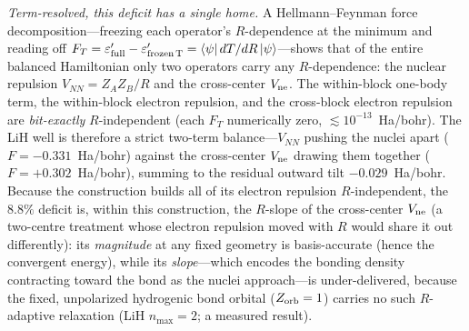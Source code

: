 \documentclass[aps,pra,twocolumn,superscriptaddress,longbibliography]{revtex4-2}
\begin{document}
\emph{Term-resolved, this deficit has a single home.}  A Hellmann--Feynman
force decomposition---freezing each operator's $R$-dependence at the minimum and
reading off $F_T = \varepsilon'_{\rm full} - \varepsilon'_{\rm frozen\,T}
= \langle\psi|\,dT/dR\,|\psi\rangle$---shows that of the entire balanced
Hamiltonian only two operators carry any $R$-dependence: the nuclear repulsion
$V_{NN} = Z_A Z_B / R$ and the cross-center $V_{\rm ne}$.  The within-block
one-body term, the within-block electron repulsion, and the cross-block electron
repulsion are \emph{bit-exactly} $R$-independent (each $F_T$ numerically zero,
$\lesssim 10^{-13}$~Ha/bohr).  The LiH well is therefore a strict two-term
balance---$V_{NN}$ pushing the nuclei apart ($F = -0.331$~Ha/bohr) against the
cross-center $V_{\rm ne}$ drawing them together ($F = +0.302$~Ha/bohr), summing
to the residual outward tilt $-0.029$~Ha/bohr.  Because the construction builds
all of its electron repulsion $R$-independent, the $8.8\%$ deficit is, within
this construction, the $R$-slope of the cross-center $V_{\rm ne}$ (a two-centre
treatment whose electron repulsion moved with $R$ would share it out
differently): its \emph{magnitude}
at any fixed geometry is basis-accurate (hence the convergent energy), while its
\emph{slope}---which encodes the bonding density contracting toward the bond as
the nuclei approach---is under-delivered, because the fixed, unpolarized
hydrogenic bond orbital ($Z_{\rm orb} = 1$) carries no such $R$-adaptive
relaxation (LiH $n_{\max} = 2$; a measured result).
\end{document}
